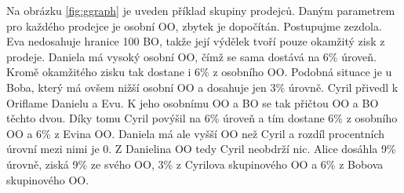 \documentclass[a4wide,12pt]{report}
\begin{document}
Na obrázku \ref{fig:ggraph} je uveden příklad skupiny prodejců. Daným parametrem pro každého prodejce je osobní OO, zbytek je dopočítán. Postupujme zezdola. Eva nedosahuje hranice 100 BO, takže její výdělek tvoří pouze okamžitý zisk z prodeje. Daniela má vysoký osobní OO, čímž se sama dostává na 6\% úroveň. Kromě okamžitého zisku tak dostane i 6\% z osobního OO. Podobná situace je u Boba, který má ovšem nižší osobní OO a dosahuje jen 3\% úrovně. Cyril přivedl k Oriflame Danielu a Evu. K jeho osobnímu OO a BO se tak přičtou OO a BO těchto dvou. Díky tomu Cyril povýšil na 6\% úroveň a tím dostane 6\% z osobního OO a 6\% z Evina OO. Daniela má ale vyšší OO než Cyril a rozdíl procentních úrovní mezi nimi je 0. Z Danielina OO tedy Cyril neobdrží nic. Alice dosáhla 9\% úrovně, ziská 9\% ze svého OO, 3\% z Cyrilova skupinového OO a 6\% z Bobova skupinového OO.
\end{document}
